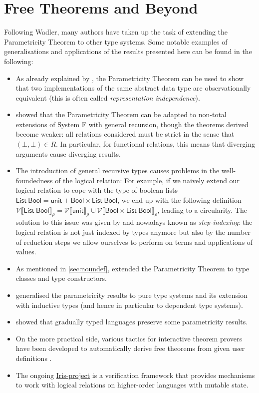 \documentclass[12pt]{article}
\theoremstyle{plain}
\theoremstyle{definition}
\newcommand{\denot}[1]{\llbracket#1\rrbracket}
\newcommand{\listt}[1]{\mathsf{List}~#1}
\newcommand{\vint}[1]{\mathcal{V}\denot{#1}}
\newcommand{\bool}{\mathsf{Bool}}
\begin{document}
\section{Free Theorems and Beyond}\label{sec:beyond}
Following Wadler, many authors have taken up the task of extending the
Parametricity Theorem to other type systems.
Some notable examples of generalisations and applications of the
results presented here can be found in the following:
\begin{itemize}
\item As already explained by \citet{Reynolds1983TypesAA}, the Parametricity Theorem can be used to show that two implementations of the same abstract data type are observationally equivalent (this is often called \emph{representation independence}).
\item \citet{wadler1989theorems} showed that the Parametricity Theorem can be adapted to non-total extensions of System F with general recursion,
though the theorems derived become weaker:
all relations considered must be strict in the sense that $(\bot,\bot)\in R$.
In particular, for functional relations, this means that diverging arguments cause diverging results.
\item The introduction of general recursive types causes problems in the well-foundedness of the logical relation:
For example, if we naively extend our logical relation to
cope with the type of boolean lists
$\listt{\bool}=\mathsf{unit}+\bool\times\listt{\bool}$,
we end up with the following definition
$\vint{\listt{\bool}}_\rho=\vint{\mathsf{unit}}_\rho\cup\vint{\bool\times\listt{\bool}}_\rho$,
leading to a circularity.
The solution to this issue was given by
\citet{10.1145/504709.504712} and nowadays known as \emph{step-indexing}:
the logical relation is not just indexed by types anymore
but also by the number of reduction steps we allow ourselves to perform on
terms and applications of values.
\item As mentioned in \cref{sec:noundef}, \citet{voigtlander2009free} extended the Parametricity Theorem to type classes and type constructors.
\item \citet{bernardy2012proofs} generalised the parametricity results to pure type systems and its extension with inductive types (and hence in particular to dependent type systems).
\item \citet{ahmed2017theorems} showed that gradually typed languages preserve some parametricity results.
\item On the more practical side, various tactics for interactive theorem provers have been developed to automatically derive free theorems from given user definitions \citep{huffman2013lifting,tabareau2021marriage}.
\item The ongoing \href{https://iris-project.org/}{Iris-project} \citep{jung2018iris} is a verification framework that provides mechanisms to work with logical relations on higher-order languages with mutable state.
\end{itemize}
\end{document}
